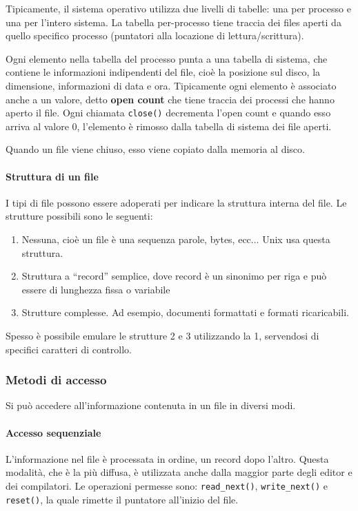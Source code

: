 \documentclass[a4paper]{article}
\begin{document}
Tipicamente, il sistema operativo utilizza due livelli di tabelle: una per processo e una per l'intero sistema. La tabella per-processo tiene traccia dei files aperti da quello specifico processo (puntatori alla locazione di lettura/scrittura).

Ogni elemento nella tabella del processo punta a una tabella di sistema, che contiene le informazioni indipendenti del file, cioè la posizione sul disco, la dimensione, informazioni di data e ora. Tipicamente ogni elemento è associato anche a un valore, detto \textbf{open count} che tiene traccia dei processi che hanno aperto il file. Ogni chiamata \texttt{close()} decrementa l'open count e quando esso arriva al valore 0, l'elemento è rimosso dalla tabella di sistema dei file aperti.

Quando un file viene chiuso, esso viene copiato dalla memoria al disco.

\paragraph{Struttura di un file}
I tipi di file possono essere adoperati per indicare la struttura interna del file. Le strutture possibili sono le seguenti:
\begin{enumerate}
    \item Nessuna, cioè un file è una sequenza parole, bytes, ecc... Unix usa questa struttura.
    \item Struttura a ``record'' semplice, dove record è un sinonimo per riga e può essere di lunghezza fissa o variabile
    \item Strutture complesse. Ad esempio, documenti formattati e formati ricaricabili.
\end{enumerate}
Spesso è possibile emulare le strutture 2 e 3 utilizzando la 1, servendosi di specifici caratteri di controllo.

\subsubsection{Metodi di accesso}
Si può accedere all'informazione contenuta in un file in diversi modi.
\paragraph{Accesso sequenziale}
L'informazione nel file è processata in ordine, un record dopo l'altro. Questa modalità, che è la più diffusa, è utilizzata anche dalla maggior parte degli editor e dei compilatori. Le operazioni permesse sono: \texttt{read\_next()}, \texttt{write\_next()} e \texttt{reset()}, la quale rimette il puntatore all'inizio del file.
\end{document}
